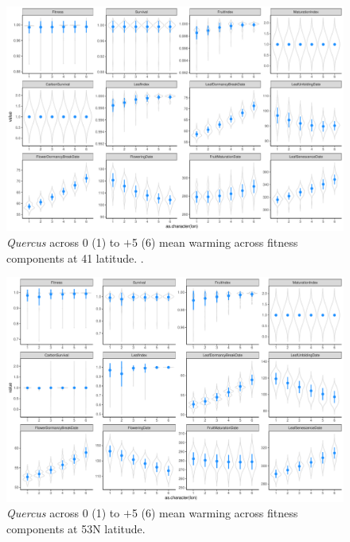 \documentclass[11pt,letter]{article}
\begin{document}
\begin{figure} 
 \begin{center}
\noindent \includegraphics[width=1\textwidth]{..//analyses/graphs/phenofit/sims/meansim41_allmetricsQR.pdf}
  \caption{\emph{Quercus} across 0 (1) to $+$5 (6) mean warming across fitness components at 41 latitude. .}
  \label{fig:quercusmean41}
  \end{center}
\end{figure}

\begin{figure} 
 \begin{center}
\noindent \includegraphics[width=1\textwidth]{..//analyses/graphs/phenofit/sims/meansim53_allmetricsQR.pdf}
  \caption{\emph{Quercus} across 0 (1) to $+$5 (6) mean warming across fitness components at 53\degree N latitude. }
  \label{fig:quercusmean53}
  \end{center}
\end{figure}
\end{document}
